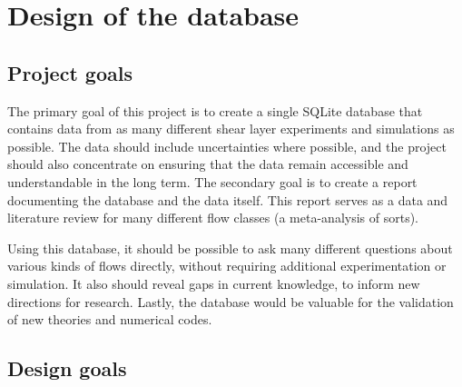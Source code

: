 %
\chapter{Design of the database}


\section{Project goals}

The primary goal of this project is to create a single SQLite database that
contains data from as many different shear layer experiments and simulations as
possible.  The data should include uncertainties where possible, and the
project should also concentrate on ensuring that the data remain accessible and
understandable in the long term.  The secondary goal is to create a report
documenting the database and the data itself.  This report serves as a data and
literature review for many different flow classes (a meta-analysis of sorts).

Using this database, it should be possible to ask many different questions
about various kinds of flows directly, without requiring additional
experimentation or simulation.  It also should reveal gaps in current
knowledge, to inform new directions for research.  Lastly, the database would
be valuable for the validation of new theories and numerical codes.


\section{Design goals}

